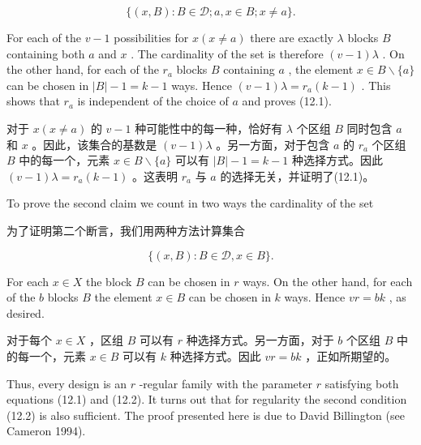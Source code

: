 \documentclass[10pt]{article}
\begin{document}
\[
\{ \left( {x,B}\right)  : B \in  \mathcal{D};a,x \in  B;x \neq  a\} .
\]

For each of the \(v - 1\) possibilities for \(x\left( {x \neq  a}\right)\) there are exactly \(\lambda\) blocks \(B\) containing both \(a\) and \(x\) . The cardinality of the set is therefore \(\left( {v - 1}\right) \lambda\) . On the other hand, for each of the \({r}_{a}\) blocks \(B\) containing \(a\) , the element \(x \in  B \smallsetminus  \{ a\}\) can be chosen in \(\left| B\right|  - 1 = k - 1\) ways. Hence \(\left( {v - 1}\right) \lambda  = {r}_{a}\left( {k - 1}\right)\) . This shows that \({r}_{a}\) is independent of the choice of \(a\) and proves (12.1).

\begin{tcolorbox}\relax
对于 \(x\left( {x \neq  a}\right)\) 的 \(v - 1\) 种可能性中的每一种，恰好有 \(\lambda\) 个区组 \(B\) 同时包含 \(a\) 和 \(x\) 。因此，该集合的基数是 \(\left( {v - 1}\right) \lambda\) 。另一方面，对于包含 \(a\) 的 \({r}_{a}\) 个区组 \(B\) 中的每一个，元素 \(x \in  B \smallsetminus  \{ a\}\) 可以有 \(\left| B\right|  - 1 = k - 1\) 种选择方式。因此 \(\left( {v - 1}\right) \lambda  = {r}_{a}\left( {k - 1}\right)\) 。这表明 \({r}_{a}\) 与 \(a\) 的选择无关，并证明了(12.1)。
\end{tcolorbox}

To prove the second claim we count in two ways the cardinality of the set

\begin{tcolorbox}\relax
为了证明第二个断言，我们用两种方法计算集合
\end{tcolorbox}

\[
\{ \left( {x,B}\right)  : B \in  \mathcal{D},x \in  B\} .
\]

For each \(x \in  X\) the block \(B\) can be chosen in \(r\) ways. On the other hand, for each of the \(b\) blocks \(B\) the element \(x \in  B\) can be chosen in \(k\) ways. Hence \({vr} = {bk}\) , as desired.

\begin{tcolorbox}\relax
对于每个 \(x \in  X\) ，区组 \(B\) 可以有 \(r\) 种选择方式。另一方面，对于 \(b\) 个区组 \(B\) 中的每一个，元素 \(x \in  B\) 可以有 \(k\) 种选择方式。因此 \({vr} = {bk}\) ，正如所期望的。
\end{tcolorbox}

Thus, every design is an \(r\) -regular family with the parameter \(r\) satisfying both equations (12.1) and (12.2). It turns out that for regularity the second condition (12.2) is also sufficient. The proof presented here is due to David Billington (see Cameron 1994).
\end{document}
